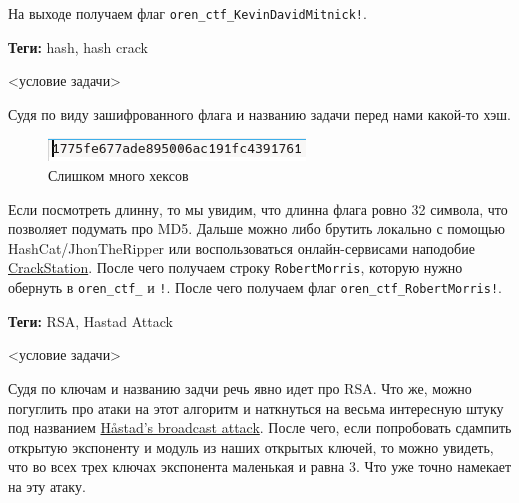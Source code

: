 \documentclass[idxtotoc,hyperref,openany,oneside]{files/crypto} %
\begin{document}
На выходе получаем флаг \verb|oren_ctf_KevinDavidMitnick!|.



\textbf{Теги:} hash, hash crack\vspace{\baselineskip}

\begin{tcolorbox}
<условие задачи>
\end{tcolorbox}

Судя по виду зашифрованного флага и названию задачи перед нами какой-то хэш.
\begin{figure}[H]
\begin{center}
\includegraphics[width=1.0\linewidth]{files/md5flag}
\end{center}
\caption{Слишком много хексов}
\label{fig:chinese}
\end{figure}
Если посмотреть длинну, то мы увидим, что длинна флага ровно 32 символа, что позволяет подумать про MD5. Дальше можно либо брутить локально с помощью HashCat/JhonTheRipper или воспользоваться онлайн-сервисами наподобие \href{https://crackstation.net/}{CrackStation}. После чего получаем строку \verb|RobertMorris|, которую нужно обернуть в \verb|oren_ctf_| и \verb|!|. После чего получаем флаг \verb|oren_ctf_RobertMorris!|.




\textbf{Теги:} RSA, Hastad Attack\vspace{\baselineskip}

\begin{tcolorbox}
<условие задачи>
\end{tcolorbox}

Судя по ключам и названию задчи речь явно идет про RSA. Что же, можно погуглить про атаки на этот алгоритм и наткнуться на весьма интересную штуку под названием \href{https://en.wikipedia.org/wiki/Coppersmith\%27s_attack#H\%C3\%A5stad's_broadcast_attack}{Håstad's broadcast attack}. После чего, если попробовать сдампить открытую экспоненту и модуль из наших открытых ключей, то можно увидеть, что во всех трех ключах экспонента маленькая и равна 3. Что уже точно намекает на эту атаку. 
\end{document}
